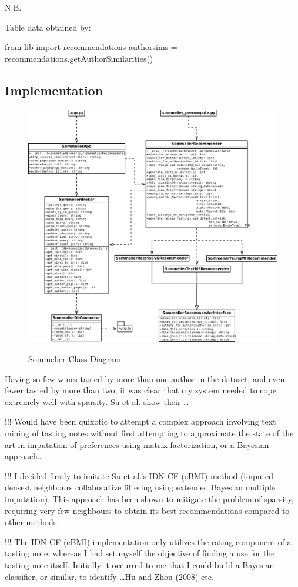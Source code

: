 N.B.

Table data obtained by:

from lib import recommendations
authorsims = recommendations.getAuthorSimilarities()


\subsection{Implementation}

\begin{figure}[h!]
    \caption{Sommelier Class Diagram}
    \centering
        \includegraphics[width=15cm]{SommelierClassDiagram}
    \label{fig:sommelierclasses}
\end{figure}

Having so few wines tasted by more than one author in the dataset, and even fewer tasted by more than two, it was clear that my system needed to cope extremely well with sparsity. Su et al. \cite{SuImputed} show their \ldots

!!! Would have been quixotic to attempt a complex approach involving text mining of tasting notes without first attempting to approximate the state of the art in imputation of preferences using matrix factorization, or a Bayesian approach\ldots

!!! I decided firstly to imitate Su et al.'s \cite{SuImputed} IDN-CF (eBMI) method (imputed densest neighbours collaborative filtering using extended Bayesian multiple imputation). This approach has been shown to mitigate the problem of sparsity, requiring very few neighbours to obtain its best recommendations compared to other methods. 

!!! The IDN-CF (eBMI) implementation only utilizes the rating component of a tasting note, whereas I had set myself the objective of finding a use for the tasting note itself. Initially it occurred to me that I could build a Bayesian classifier, or similar, to identify \ldots Hu and Zhou (2008) etc.




